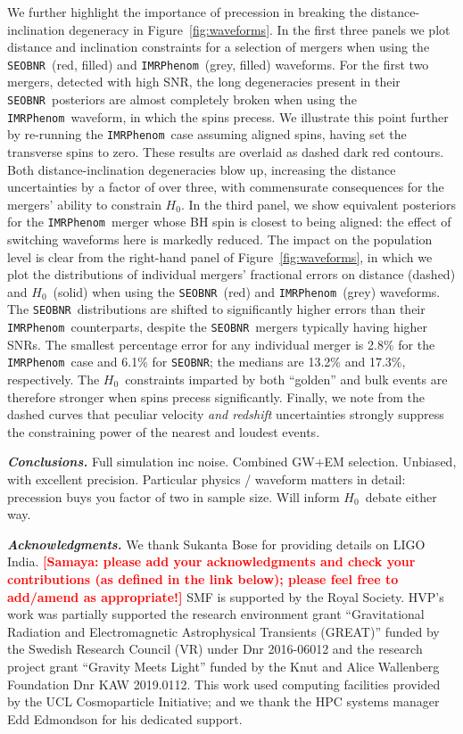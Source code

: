 \documentclass[%
 reprint,
 superscriptaddress,
 nofootinbib,
 amsmath,amssymb,
 aps,
]{revtex4-2}
\newcommand{\hubble}{\ensuremath{H_0}}
\newcommand{\seobnr}{\texttt{SEOBNR}}
\newcommand{\imrp}{\texttt{IMRPhenom}}
\newcommand{\smf}[1]{\textcolor{red}{\bf [#1]}}
\begin{document}
We further highlight the importance of precession in breaking the distance-inclination degeneracy in Figure~\ref{fig:waveforms}. In the first three panels we plot distance and inclination constraints for a selection of mergers when using the \seobnr\ (red, filled) and \imrp\ (grey, filled) waveforms.
For the first two mergers, detected with high SNR, the long degeneracies present in their \seobnr\ posteriors are almost completely broken when using the \imrp\ waveform, in which the spins precess. We illustrate this point further by re-running the \imrp\ case assuming aligned spins, having set the transverse spins to zero. These results are overlaid as dashed dark red contours. Both distance-inclination degeneracies blow up, increasing the distance uncertainties by a factor of over three, with commensurate consequences for the mergers' ability to constrain $H_0$. In the third panel, we show equivalent posteriors for the \imrp\ merger whose BH spin is closest to being aligned: the effect of switching waveforms here is markedly reduced. The impact on the population level is clear from the right-hand panel of Figure~\ref{fig:waveforms}, in which we plot the distributions of individual mergers' fractional errors on distance (dashed) and \hubble\ (solid) when using the \seobnr\ (red) and \imrp\ (grey) waveforms. The \seobnr\ distributions are shifted to significantly higher errors than their \imrp\ counterparts, despite the \seobnr\ mergers typically having higher SNRs. The smallest percentage error for any individual merger is 2.8\% for the \imrp\ case and 6.1\% for \seobnr; the medians are 13.2\% and 17.3\%, respectively. The \hubble\ constraints imparted by both ``golden'' and bulk events are therefore stronger when spins precess significantly. Finally, we note from the dashed curves that peculiar velocity {\it and redshift} uncertainties strongly suppress the constraining power of the nearest and loudest events.


\textbf{\emph{Conclusions.}} Full simulation inc noise. Combined GW+EM selection. Unbiased, with excellent precision. Particular physics / waveform matters in detail: precession buys you factor of two in sample size. Will inform \hubble\ debate either way.


\textbf{\emph{Acknowledgments.}} We thank Sukanta Bose for providing details on LIGO India. \smf{Samaya: please add your acknowledgments and check your contributions (as defined in the link below); please feel free to add/amend as appropriate!} SMF is supported by the Royal Society. HVP's work was partially supported the research environment grant ``Gravitational Radiation and Electromagnetic Astrophysical Transients (GREAT)'' funded by the Swedish Research Council (VR) under Dnr 2016-06012 and the research project grant ``Gravity Meets Light'' funded by the Knut and Alice Wallenberg Foundation Dnr KAW 2019.0112. This work used computing facilities provided by the UCL Cosmoparticle Initiative; and we thank the HPC systems manager Edd Edmondson for his dedicated support.
\end{document}
